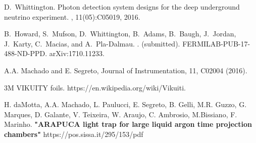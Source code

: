 

\begin{thebibliography}{1}
D.~Whittington.
\newblock Photon detection system designs for the deep underground neutrino
  experiment.
, 11(05):C05019, 2016.

B.~Howard, S.~Mufson, D.~Whittington, B.~Adams, B.~Baugh, J.~Jordan, J.~Karty,
  C.~Macias, and A.~Pla-Dalmau.
.
 (submitted).
\newblock FERMILAB-PUB-17-488-ND-PPD.
\newblock arXiv:1710.11233.

\end{thebibliography}





\begin{thebibliography}{99}
\footnotesize{

 A.A. Machado and E. Segreto, Journal of Instrumentation, 11, C02004 (2016).

	3M VIKUITY foils. https://en.wikipedia.org/wiki/Vikuiti.
    
 H. daMotta, A.A. Machado, L. Paulucci, E. Segreto, B. Gelli, M.R. Guzzo, G. Marques, D. Galante, V. Teixeira, W. Araujo, C. Ambrosio, M.Bissiano, F. Marinho. {\bf"ARAPUCA light trap for large liquid argon time projection chambers"}
    https://pos.sissa.it/295/153/pdf

}
\end{thebibliography}

